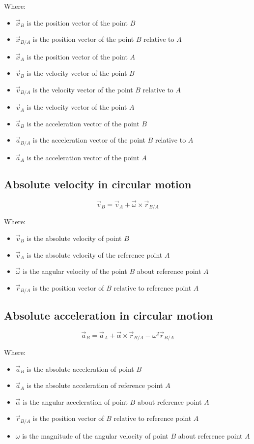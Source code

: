 \documentclass[11pt]{article}
\begin{document}
Where:
\begin{itemize}
\item \(\vec{x}_B\) is the position vector of the point \(B\)
\item \(\vec{x}_{B/A}\) is the position vector of the point \(B\) relative to \(A\)
\item \(\vec{x}_A\) is the position vector of the point \(A\)
\item \(\vec{v}_B\) is the velocity vector of the point \(B\)
\item \(\vec{v}_{B/A}\) is the velocity vector of the point \(B\) relative to \(A\)
\item \(\vec{v}_A\) is the velocity vector of the point \(A\)
\item \(\vec{a}_B\) is the acceleration vector of the point \(B\)
\item \(\vec{a}_{B/A}\) is the acceleration vector of the point \(B\) relative to \(A\)
\item \(\vec{a}_A\) is the acceleration vector of the point \(A\)
\end{itemize}
\subsection{Absolute velocity in circular motion}
\label{sec:orgb4529c8}
\[\vec{v}_B = \vec{v}_A + \vec{\omega} \times \vec{r}_{B/A}\]

Where:
\begin{itemize}
\item \(\vec{v}_B\) is the absolute velocity of point \(B\)
\item \(\vec{v}_A\) is the absolute velocity of the reference point \(A\)
\item \(\vec{\omega}\) is the angular velocity of the point \(B\) about reference point \(A\)
\item \(\vec{r}_{B/A}\) is the position vector of \(B\) relative to reference point \(A\)
\end{itemize}
\subsection{Absolute acceleration in circular motion}
\label{sec:org390016b}
\[\vec{a}_B = \vec{a}_A + \vec{\alpha} \times \vec{r}_{B/A} - \omega^2 \vec{r}_{B/A}\]

Where:
\begin{itemize}
\item \(\vec{a}_B\) is the absolute acceleration of point \(B\)
\item \(\vec{a}_A\) is the absolute acceleration of reference point \(A\)
\item \(\vec{\alpha}\) is the angular acceleration of point \(B\) about reference point \(A\)
\item \(\vec{r}_{B/A}\) is the position vector of \(B\) relative to reference point \(A\)
\item \(\omega\) is the magnitude of the angular velocity of point \(B\) about reference point \(A\)
\end{itemize}
\end{document}
